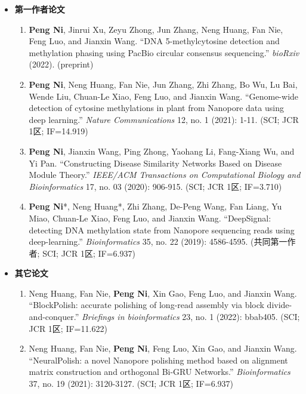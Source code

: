 \documentclass[zh]{resume}
\begin{document}
\begin{itemize}
  \item \textbf{第一作者论文}
  \begin{enumerate}
    \item \textbf{Peng Ni}, Jinrui Xu, Zeyu Zhong, Jun Zhang, Neng Huang, Fan Nie, Feng Luo, and Jianxin Wang. \enquote{DNA 5-methylcytosine detection and methylation phasing using PacBio circular consensus sequencing.} {\it bioRxiv} (2022). (preprint)
    \item \textbf{Peng Ni}, Neng Huang, Fan Nie, Jun Zhang, Zhi Zhang, Bo Wu, Lu Bai, Wende Liu, Chuan-Le Xiao, Feng Luo, and Jianxin Wang. \enquote{Genome-wide detection of cytosine methylations in plant from Nanopore data using deep learning.} {\it Nature Communications} 12, no. 1 (2021): 1-11. (SCI; JCR 1区; IF=14.919)
    \bigskip
    \medskip
    \item \textbf{Peng Ni}, Jianxin Wang, Ping Zhong, Yaohang Li, Fang-Xiang Wu, and Yi Pan. \enquote{Constructing Disease Similarity Networks Based on Disease Module Theory.} {\it IEEE/ACM Transactions on Computational Biology and Bioinformatics} 17, no. 03 (2020): 906-915. (SCI; JCR 1区; IF=3.710)
    \item \textbf{Peng Ni}*, Neng Huang*, Zhi Zhang, De-Peng Wang, Fan Liang, Yu Miao, Chuan-Le Xiao, Feng Luo, and Jianxin Wang. \enquote{DeepSignal: detecting DNA methylation state from Nanopore sequencing reads using deep-learning.} {\it Bioinformatics} 35, no. 22 (2019): 4586-4595. (共同第一作者; SCI; JCR 1区; IF=6.937)
  \end{enumerate}
  \medskip
  \item \textbf{其它论文}
  \begin{enumerate}
    \item Neng Huang, Fan Nie, \textbf{Peng Ni}, Xin Gao, Feng Luo, and Jianxin Wang. \enquote{BlockPolish: accurate polishing of long-read assembly via block divide-and-conquer.} {\it Briefings in bioinformatics} 23, no. 1 (2022): bbab405. (SCI; JCR 1区; IF=11.622)
    \item Neng Huang, Fan Nie, \textbf{Peng Ni}, Feng Luo, Xin Gao, and Jianxin Wang. \enquote{NeuralPolish: a novel Nanopore polishing method based on alignment matrix construction and orthogonal Bi-GRU Networks.} {\it Bioinformatics} 37, no. 19 (2021): 3120-3127. (SCI; JCR 1区; IF=6.937)

\end{enumerate}
\end{itemize}
\end{document}
